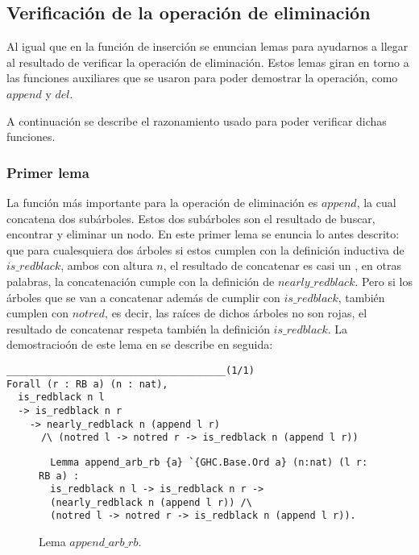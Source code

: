 \subsection{Verificación de la operación de eliminación}
Al igual que en la funci\'on de inserci\'on se enuncian lemas para ayudarnos a llegar al resultado
de verificar la operación de eliminación. Estos lemas giran en torno a las funciones auxiliares
que se usaron para poder demostrar la operación, como \hyperref[func_app]{$append$} y 
\hyperref[func_del]{$del$}.

A continuación se describe el razonamiento usado para poder verificar dichas funciones.

\subsubsection{Primer lema}


La funci\'on m\'as importante para la operaci\'on de eliminaci\'on es \hyperref[func_app]{$append$}, 
la cual concatena dos subárboles. Estos dos subárboles son el resultado de buscar, encontrar y 
eliminar un nodo. En este primer lema se enuncia lo antes descrito: que para cualesquiera dos 
\'arboles si estos cumplen con la definici\'on inductiva de 
\hyperref[inductive_isRedB]{$is\_redblack$}, ambos con altura $n$, el resultado de concatenar es 
casi un {\arn}, en otras palabras, la concatenaci\'on cumple con la definición de
\hyperref[inductive_isRedB]{$nearly\_redblack$}. Pero si los \'arboles que se van a concatenar 
además de cumplir con \hyperref[inductive_isRedB]{$is\_redblack$}, también cumplen con $notred$, es 
decir, las ra\'ices de dichos \'arboles no son rojas, el resultado de concatenar respeta también la 
definici\'on \hyperref[inductive_isRedB]{$is\_redblack$}. La demostracio\'on de este lema en {\coq} 
se describe en seguida:

\begin{verbatim}
______________________________________(1/1)
Forall (r : RB a) (n : nat),
  is_redblack n l
  -> is_redblack n r
    -> nearly_redblack n (append l r)
      /\ (notred l -> notred r -> is_redblack n (append l r))
\end{verbatim}

\begin{figure}[!ht]
  \centering
  \captionsetup{justification=centering}
  \begin{verbatim}
  Lemma append_arb_rb {a} `{GHC.Base.Ord a} (n:nat) (l r: RB a) :
  is_redblack n l -> is_redblack n r ->
  (nearly_redblack n (append l r)) /\
  (notred l -> notred r -> is_redblack n (append l r)).
  \end{verbatim}
  \caption{Lema $append\_arb\_rb$.}
  \label{lema_4}
  \end{figure}

